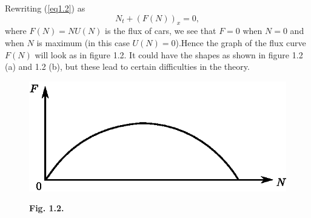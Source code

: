 Rewriting (\ref{eq1.2}) as
$$
N_t + (F(N))_x = 0,
$$
where $F(N) = NU(N)$ is the flux of cars, we see that $F=0$ when $N=0$
and when $N$ is maximum (in this case $U(N)=0$).\pageoriginale Hence
the graph of the flux curve $F(N)$ will look as in figure 1.2. It
could have the shapes as shown in figure 1.2 (a) and 1.2 (b), but
these lead to certain difficulties in the theory. 
\begin{figure}[H]
\centering
\includegraphics{figures/fig1.2.eps}
\centerline{\bf Fig. 1.2.}
\end{figure}


